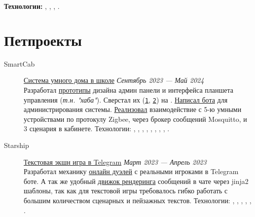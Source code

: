 \documentclass[margin,line]{resume}
\begin{document}
\begin{resume}
\begin{description}
      \textbf{Технологии:}
      ,
      , ,
      .
  \end{description}

  \section{\mysidestyle Петпроекты}\vspace{2mm}

  \begin{description}

    \item[SmartCab]\small{\href{https://github.com/smart-cab}{Система
        умного дома в школе} \hfill
      \textsl{Сентябрь 2023 — Май 2024\vspace{1mm}}}\\
      Разработал
      \href{https://www.figma.com/design/8H1tFpxgmIDV1xp06ndi73/SmartCab?node-id=0-1&p=f}{прототипы}
      дизайна админ панели и интерфейса планшета управления
      (\textit{т.н. "хаба"}). Сверстал их
      (\texttt{\href{https://github.com/smart-cab/smartcab-hub/tree/main/frontend/src}{1}},
      \texttt{\href{https://github.com/smart-cab/smartcab-dashboard/tree/main/frontend/src}{2}})
      на .
      \href{https://github.com/smart-cab/smartcab-bot}{Написал бота}
      для администрирования системы.
      \href{https://github.com/smart-cab/smartcab-hub/blob/main/backend/smartcab/interface/mqtt.py}{Реализовал}
      взаимодействие с 5-ю умными устройствами по протокулу Zigbee, через
      брокер сообщений Mosquitto, и 3 сценария в кабинете.
      Технологии:
      , ,
      , ,
      ,
      , ,
      , .
      \vspace{3mm}

    \item[Starship]\small{\href{https://github.com/starship-crew}{Текстовая
        экшн игра в Telegram}
      \hfill \textsl{Март 2023 — Апрель 2023\vspace{1mm}}}\\
      Разработал механику
      \href{https://github.com/starship-crew/telegram-client/blob/main/app/handlers/fight.py}{онлайн
      дуэлей} с реальными игроками в Telegram боте. А
      так же удобный
      \href{https://github.com/starship-crew/telegram-client/blob/main/app/template.py}{движок
      рендеринга}
      сообщений в чате через jinja2 шаблоны, так как для текстовой игры
      требовалось гибко работать с большим количеством сценарных и
      пейзажных текстов.
      Технологии:
      , ,
      ,
      , ,
      .


\end{description}
\end{resume}
\end{document}
